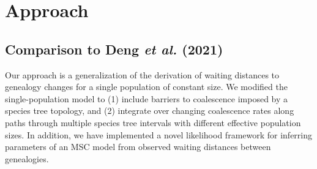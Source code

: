 \documentclass[11pt]{article}
\begin{document}












\section{Approach}
\subsection{Comparison to Deng \emph{et al.} (2021)} %

Our approach is a generalization of the \citet{deng_distribution_2021} derivation 
of waiting distances to genealogy changes for a single population of constant size. 
We modified the single-population model to (1) include barriers to coalescence imposed
by a species tree topology, and (2) integrate over changing coalescence rates along
paths through multiple species tree intervals with different effective population 
sizes. In addition, we have implemented a novel likelihood framework for inferring 
parameters of an MSC model from observed waiting distances between genealogies.
\end{document}
